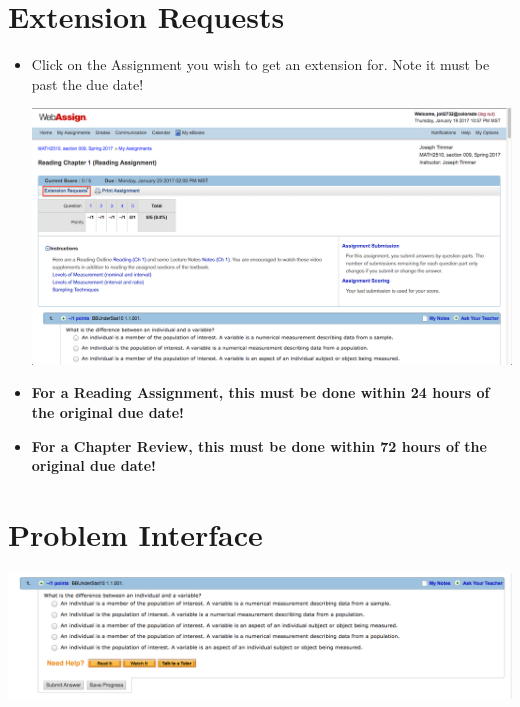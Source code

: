 \documentclass{article}
\begin{document}
\newpage

\section*{Extension Requests}

\begin{itemize}

\item Click on the Assignment you wish to get an extension for. Note it must be past the due date!

\begin{center}
\includegraphics[scale=0.25]{assignment.png}
\end{center}

\item \textbf{For a Reading Assignment, this must be done within 24 hours of the original due date!}

\item \textbf{For a Chapter Review, this must be done within 72 hours of the original due date!}

\end{itemize}

\section*{Problem Interface}

\begin{center}
\includegraphics[scale=0.25]{problem.png}
\end{center}
\end{document}
